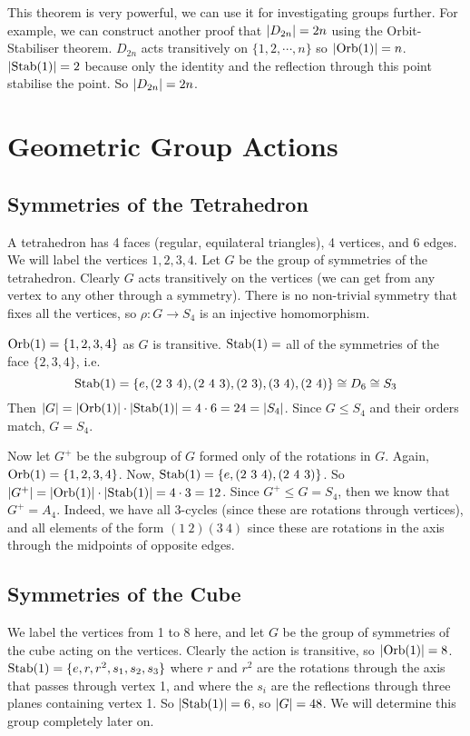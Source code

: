 \documentclass{article}
\begin{document}
This theorem is very powerful, we can use it for investigating groups further. For example, we can construct another proof that $\abs{D_{2n}} = 2n$ using the Orbit-Stabiliser theorem. $D_{2n}$ acts transitively on $\{1, 2, \cdots, n\}$ so $\abs{\operatorname{Orb}(1)} = n$. $\abs{\operatorname{Stab}(1)} = 2$ because only the identity and the reflection through this point stabilise the point. So $\abs{D_{2n}} = 2n$.

\section{Geometric Group Actions}
\subsection{Symmetries of the Tetrahedron}
A tetrahedron has 4 faces (regular, equilateral triangles), 4 vertices, and 6 edges. We will label the vertices $1, 2, 3, 4$. Let $G$ be the group of symmetries of the tetrahedron. Clearly $G$ acts transitively on the vertices (we can get from any vertex to any other through a symmetry). There is no non-trivial symmetry that fixes all the vertices, so $\rho\colon G \to S_4$ is an injective homomorphism.

$\operatorname{Orb}(1) = \{ 1, 2, 3, 4 \}$ as $G$ is transitive. $\operatorname{Stab}(1) =$ all of the symmetries of the face $\{2,3,4\}$, i.e.
\[ \operatorname{Stab}(1) = \{ e, (2\ 3\ 4), (2\ 4\ 3), (2\ 3), (3\ 4), (2\ 4) \} \cong D_6 \cong S_3 \]
Then $\abs{G} = \abs{\operatorname{Orb}(1)} \cdot \abs{\operatorname{Stab}(1)} = 4 \cdot 6 = 24 = \abs{S_4}$. Since $G \leq S_4$ and their orders match, $G = S_4$.

Now let $G^+$ be the subgroup of $G$ formed only of the rotations in $G$. Again, $\operatorname{Orb}(1) = \{ 1, 2, 3, 4 \}$. Now, $\operatorname{Stab}(1) = \{ e, (2\ 3\ 4), (2\ 4\ 3) \}$. So $\abs{G^+} = \abs{\operatorname{Orb}(1)} \cdot \abs{\operatorname{Stab}(1)} = 4 \cdot 3 = 12$. Since $G^+ \leq G = S_4$, then we know that $G^+ = A_4$. Indeed, we have all 3-cycles (since these are rotations through vertices), and all elements of the form $(1\ 2)(3\ 4)$ since these are rotations in the axis through the midpoints of opposite edges.

\subsection{Symmetries of the Cube}
We label the vertices from 1 to 8 here, and let $G$ be the group of symmetries of the cube acting on the vertices. Clearly the action is transitive, so $\abs{\operatorname{Orb}(1)} = 8$. $\operatorname{Stab}(1) = \{ e, r, r^2, s_1, s_2, s_3 \}$ where $r$ and $r^2$ are the rotations through the axis that passes through vertex 1, and where the $s_i$ are the reflections through three planes containing vertex 1. So $\abs{\operatorname{Stab}(1)} = 6$, so $\abs{G} = 48$. We will determine this group completely later on.
\end{document}

